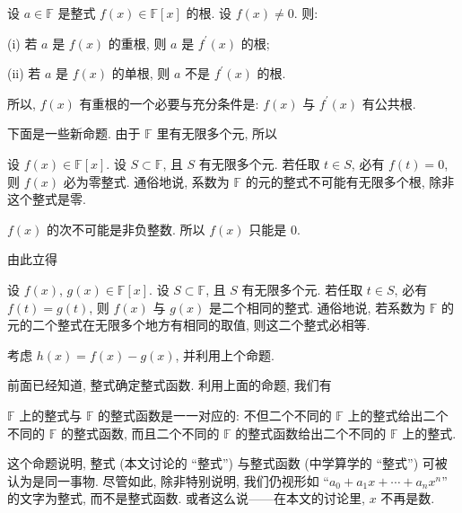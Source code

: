 \begin{proposition}
    设 $a \in \mathbb{F}$ 是整式 $f(x) \in \mathbb{F}[x]$ 的根. 设 $f(x) \neq 0$. 则:

    (i) 若 $a$ 是 $f(x)$ 的重根, 则 $a$ 是 $f^{\prime} (x)$ 的根;

    (ii) 若 $a$ 是 $f(x)$ 的单根, 则 $a$ 不是 $f^{\prime} (x)$ 的根.

    所以, $f(x)$ 有重根的一个必要与充分条件是: $f(x)$ 与 $f^{\prime} (x)$ 有公共根.
\end{proposition}

下面是一些新命题. 由于 $\mathbb{F}$ 里有无限多个元, 所以

\begin{proposition}
    设 $f(x) \in \mathbb{F}[x]$. 设 $S \subset \mathbb{F}$, 且 $S$ 有无限多个元. 若任取 $t \in S$, 必有 $f(t) = 0$, 则 $f(x)$ 必为零整式. 通俗地说, 系数为 $\mathbb{F}$ 的元的整式不可能有无限多个根, 除非这个整式是零.
\end{proposition}

\begin{pf}
    $f(x)$ 的次不可能是非负整数. 所以 $f(x)$ 只能是 $0$.
\end{pf}

由此立得

\begin{proposition}
    设 $f(x)$, $g(x) \in \mathbb{F}[x]$. 设 $S \subset \mathbb{F}$, 且 $S$ 有无限多个元. 若任取 $t \in S$, 必有 $f(t) = g(t)$, 则 $f(x)$ 与 $g(x)$ 是二个相同的整式. 通俗地说, 若系数为 $\mathbb{F}$ 的元的二个整式在无限多个地方有相同的取值, 则这二个整式必相等.
\end{proposition}

\begin{pf}
    考虑 $h(x) = f(x) - g(x)$, 并利用上个命题.
\end{pf}

前面已经知道, 整式确定整式函数. 利用上面的命题, 我们有

\begin{proposition}
    $\mathbb{F}$ 上的整式与 $\mathbb{F}$ 的整式函数是一一对应的: 不但二个不同的 $\mathbb{F}$ 上的整式给出二个不同的 $\mathbb{F}$ 的整式函数, 而且二个不同的 $\mathbb{F}$ 的整式函数给出二个不同的 $\mathbb{F}$ 上的整式.
\end{proposition}

\begin{remark}
    这个命题说明, 整式 (本文讨论的 ``整式'') 与整式函数 (中学算学的 ``整式'') 可被认为是同一事物. 尽管如此, 除非特别说明, 我们仍视形如 ``$a_0 + a_1 x + \cdots + a_n x^n$'' 的文字为整式, 而不是整式函数. 或者这么说——在本文的讨论里, $x$ 不再是数.
\end{remark}
